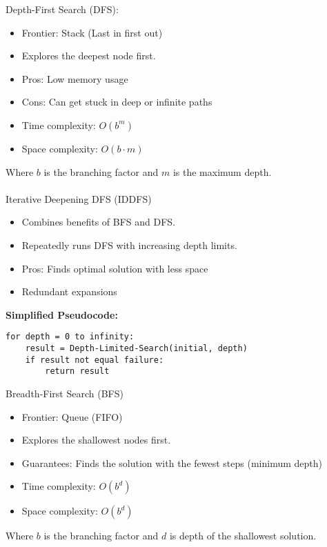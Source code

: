  Depth-First Search (DFS):
 \begin{itemize}
    \item Frontier: Stack (Last in first out)
    \item Explores the deepest node first.
    \item Pros: Low memory usage
    \item Cons: Can get stuck in deep or infinite paths
    \item Time complexity: $O(b^m)$
    \item Space complexity: $O(b \cdot m)$\\
 \end{itemize}

 Where $b$ is the branching factor and $m$ is the maximum depth.\\\\

Iterative Deepening DFS (IDDFS)
\begin{itemize}
    \item Combines benefits of BFS and DFS.
    \item Repeatedly runs DFS with increasing depth limits.
    \item Pros: Finds optimal solution with less space
    \item Redundant expansions\\
\end{itemize}


\textbf{Simplified Pseudocode:}
\begin{verbatim}
for depth = 0 to infinity:
    result = Depth-Limited-Search(initial, depth)
    if result not equal failure:
        return result
\end{verbatim}

Breadth-First Search (BFS)
\begin{itemize}
    \item Frontier: Queue (FIFO)
    \item Explores the shallowest nodes first.
    \item Guarantees: Finds the solution with the fewest steps (minimum depth)
    \item Time complexity: $O(b^d)$  
    \item Space complexity: $O(b^d)$\\
\end{itemize}

Where $b$ is the branching factor and $d$ is depth of the shallowest solution.\\\\


